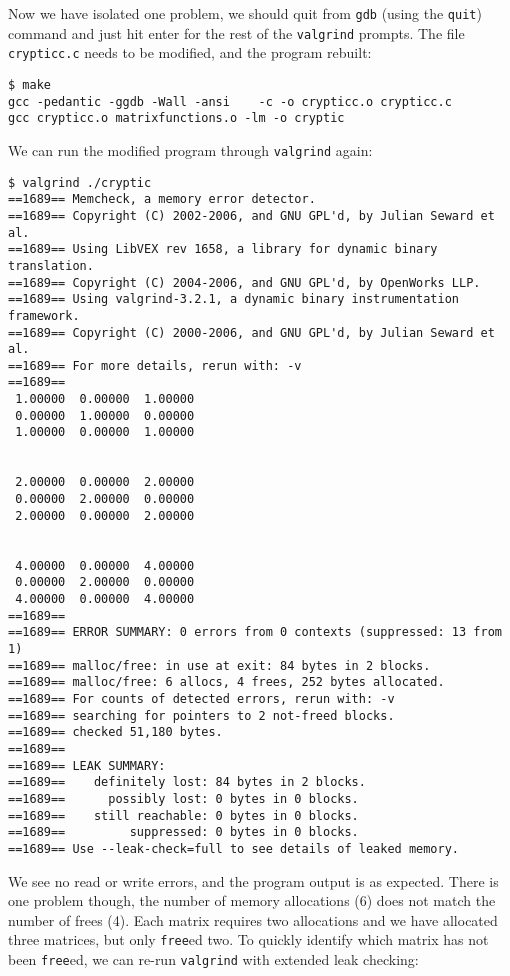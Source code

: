 \documentclass[a4paper,12pt]{article}
\begin{document}
Now we have isolated one problem, we should quit from {\tt gdb} (using the {\tt quit}) command and just hit enter for the rest of the {\tt valgrind} prompts. The file {\tt crypticc.c} needs to be modified, and the program rebuilt:
\begin{verbatim}
$ make
gcc -pedantic -ggdb -Wall -ansi    -c -o crypticc.o crypticc.c
gcc crypticc.o matrixfunctions.o -lm -o cryptic
\end{verbatim}
We can run the modified program through {\tt valgrind} again:
\begin{verbatim}
$ valgrind ./cryptic
==1689== Memcheck, a memory error detector.
==1689== Copyright (C) 2002-2006, and GNU GPL'd, by Julian Seward et al.
==1689== Using LibVEX rev 1658, a library for dynamic binary translation.
==1689== Copyright (C) 2004-2006, and GNU GPL'd, by OpenWorks LLP.
==1689== Using valgrind-3.2.1, a dynamic binary instrumentation framework.
==1689== Copyright (C) 2000-2006, and GNU GPL'd, by Julian Seward et al.
==1689== For more details, rerun with: -v
==1689== 
 1.00000  0.00000  1.00000 
 0.00000  1.00000  0.00000 
 1.00000  0.00000  1.00000 


 2.00000  0.00000  2.00000 
 0.00000  2.00000  0.00000 
 2.00000  0.00000  2.00000 


 4.00000  0.00000  4.00000 
 0.00000  2.00000  0.00000 
 4.00000  0.00000  4.00000 
==1689== 
==1689== ERROR SUMMARY: 0 errors from 0 contexts (suppressed: 13 from 1)
==1689== malloc/free: in use at exit: 84 bytes in 2 blocks.
==1689== malloc/free: 6 allocs, 4 frees, 252 bytes allocated.
==1689== For counts of detected errors, rerun with: -v
==1689== searching for pointers to 2 not-freed blocks.
==1689== checked 51,180 bytes.
==1689== 
==1689== LEAK SUMMARY:
==1689==    definitely lost: 84 bytes in 2 blocks.
==1689==      possibly lost: 0 bytes in 0 blocks.
==1689==    still reachable: 0 bytes in 0 blocks.
==1689==         suppressed: 0 bytes in 0 blocks.
==1689== Use --leak-check=full to see details of leaked memory.
\end{verbatim}
We see no read or write errors, and the program output is as expected. There is one problem though, the number of memory allocations (6) does not match the number of frees (4). Each matrix requires two allocations and we have allocated three matrices, but only {\tt free}ed two. To quickly identify which matrix has not been {\tt free}ed, we can re-run {\tt valgrind} with extended leak checking:
\end{document}
